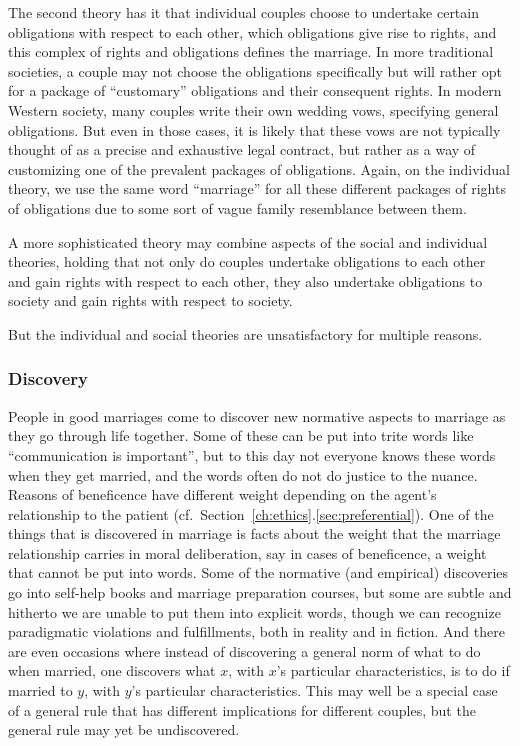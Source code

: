 The second theory has it that individual couples choose to undertake certain obligations with respect to each other, which obligations give rise to rights,
and this complex of rights and obligations defines the marriage. In more traditional societies, a couple may not choose the obligations specifically
but will rather opt for a package of ``customary'' obligations and their consequent rights. In modern Western society, many couples write their own
wedding vows, specifying general obligations. But even in those cases, it is likely that these vows are not typically thought of as a precise and exhaustive
legal contract, but rather as a way of customizing one of the prevalent packages of obligations. Again, on the individual theory, we use the same word
``marriage'' for all these different packages of rights of obligations due to some sort of vague family resemblance between them.

A more sophisticated theory may combine aspects of the social and individual theories, holding that not only do couples undertake obligations to each other and gain
rights with respect to each other, they also undertake obligations to society and gain rights with respect to society.

But the individual and social theories are unsatisfactory for multiple reasons.

\subsubsection{Discovery}
People in good marriages come to discover new normative aspects to marriage as they go through life together.
Some of these can be put into trite words like ``communication is important'', but to this day not everyone knows these
words when they get married, and the words often do not do justice to the nuance. Reasons of beneficence have 
different weight depending on the agent's relationship to the
patient (cf.\ Section~\ref{ch:ethics}.\ref{sec:preferential}). One of the things that is discovered in marriage is facts about the weight that the marriage relationship
carries in moral deliberation, say in cases of beneficence, a weight that cannot be put into words. Some of the 
normative (and empirical) discoveries go into self-help books and marriage preparation courses, but some are
subtle and hitherto we are unable to put them into explicit words, though we can recognize paradigmatic violations and
fulfillments, both in reality and in fiction. And there are even occasions where instead of discovering
a general norm of what to do when married, one discovers what $x$, with $x$'s particular characteristics, is 
to do if married to $y$, with $y$'s particular characteristics. This may well be a special case of a general rule that 
has different implications for different couples, but the general rule may yet be undiscovered.

